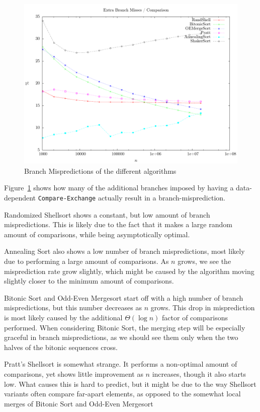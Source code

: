 \begin{figure}
\center
\includegraphics[width=\textwidth]{graphs/CompareExchange/branchdiff.pdf}
\caption{Branch Mispredictions of the different algorithms}
\label{fig:CompareExchange:branchdiff}
\end{figure}

Figure~\ref{fig:CompareExchange:branchdiff} shows how many of the additional branches imposed by having a data-dependent \texttt{Compare-Exchange} actually result in a branch-misprediction.

Randomized Shellsort shows a constant, but low amount of branch mispredictions. This is likely due to the fact that it makes a large random amount of comparisons, while being asymptotically optimal.

Annealing Sort also shows a low number of branch mispredictions, most likely due to performing a large amount of comparisons. As $n$ grows, we see the misprediction rate grow slightly, which might be caused by the algorithm moving slightly closer to the minimum amount of comparisons.

Bitonic Sort and Odd-Even Mergesort start off with a high number of branch mispredictions, but this number decreases as $n$ grows. This drop in misprediction is most likely caused by the additional $\Theta(\log n)$ factor of comparisons performed. When considering Bitonic Sort, the merging step will be especially graceful in branch mispredictions, as we should see them only when the two halves of the bitonic sequences cross.

Pratt's Shellsort is somewhat strange. It performs a non-optimal amount of comparisons, yet shows little improvement as $n$ increases, though it also starts low. What causes this is hard to predict, but it might be due to the way Shellsort variants often compare far-apart elements, as opposed to the somewhat local merges of Bitonic Sort and Odd-Even Mergesort

